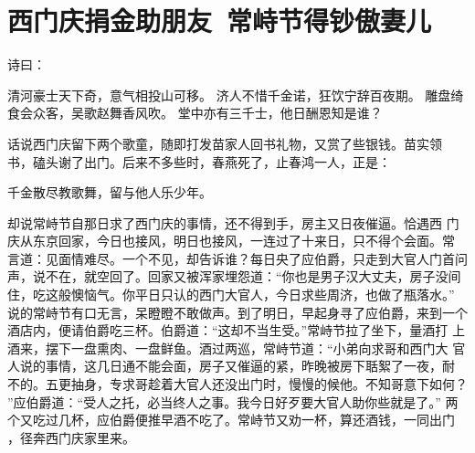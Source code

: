\chapter{西门庆捐金助朋友~常峙节得钞傲妻儿}

诗曰：

清河豪士天下奇，意气相投山可移。
济人不惜千金诺，狂饮宁辞百夜期。
雕盘绮食会众客，吴歌赵舞香风吹。
堂中亦有三千士，他日酬恩知是谁？

话说西门庆留下两个歌童，随即打发苗家人回书礼物，又赏了些银钱。苗实领
书，磕头谢了出门。后来不多些时，春燕死了，止春鸿一人，正是：

千金散尽教歌舞，留与他人乐少年。

却说常峙节自那日求了西门庆的事情，还不得到手，房主又日夜催逼。恰遇西
门庆从东京回家，今日也接风，明日也接风，一连过了十来日，只不得个会面。常
言道：见面情难尽。一个不见，却告诉谁？每日央了应伯爵，只走到大官人门首问
声，说不在，就空回了。回家又被浑家埋怨道：“你也是男子汉大丈夫，房子没间
住，吃这般懊恼气。你平日只认的西门大官人，今日求些周济，也做了瓶落水。”
说的常峙节有口无言，呆瞪瞪不敢做声。到了明日，早起身寻了应伯爵，来到一个
酒店内，便请伯爵吃三杯。伯爵道：“这却不当生受。”常峙节拉了坐下，量酒打
上酒来，摆下一盘熏肉、一盘鲜鱼。酒过两巡，常峙节道：“小弟向求哥和西门大
官人说的事情，这几日通不能会面，房子又催逼的紧，昨晚被房下聒絮了一夜，耐
不的。五更抽身，专求哥趁着大官人还没出门时，慢慢的候他。不知哥意下如何？
”应伯爵道：“受人之托，必当终人之事。我今日好歹要大官人助你些就是了。”
两个又吃过几杯，应伯爵便推早酒不吃了。常峙节又劝一杯，算还酒钱，一同出门
，径奔西门庆家里来。


